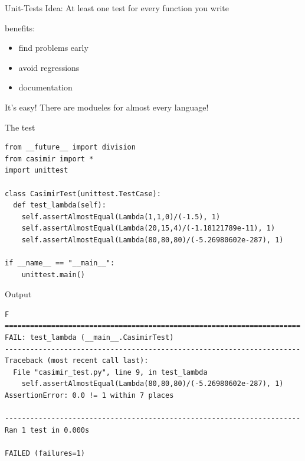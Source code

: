 \documentclass[12pt,compress,mathserif]{beamer}
\begin{document}
\begin{frame}{Unit-Tests}
    Idea: At least one test for every function you write

    \vfill

    benefits:
    \begin{itemize}
        \item find problems early
        \item avoid regressions
        \item documentation
    \end{itemize}

    \vfill

    It's easy! There are modueles for almost every language!
\end{frame}

\begin{frame}[fragile]{The test}
\begin{lstlisting}
from __future__ import division
from casimir import *
import unittest

class CasimirTest(unittest.TestCase):
  def test_lambda(self):
    self.assertAlmostEqual(Lambda(1,1,0)/(-1.5), 1)
    self.assertAlmostEqual(Lambda(20,15,4)/(-1.18121789e-11), 1)
    self.assertAlmostEqual(Lambda(80,80,80)/(-5.26980602e-287), 1)

if __name__ == "__main__":
    unittest.main()
\end{lstlisting}
\end{frame}

\begin{frame}[fragile]{Output}
\scriptsize
\begin{verbatim}
F
======================================================================
FAIL: test_lambda (__main__.CasimirTest)
----------------------------------------------------------------------
Traceback (most recent call last):
  File "casimir_test.py", line 9, in test_lambda
    self.assertAlmostEqual(Lambda(80,80,80)/(-5.26980602e-287), 1)
AssertionError: 0.0 != 1 within 7 places

----------------------------------------------------------------------
Ran 1 test in 0.000s

FAILED (failures=1)
\end{verbatim}
\end{frame}
\end{document}

